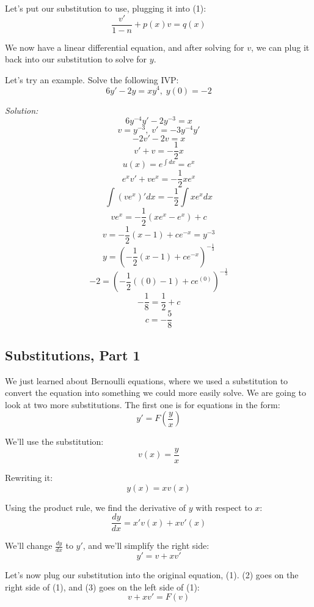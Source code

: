 Let's put our substitution to use, plugging it into (1):
$$\frac{v'}{1 - n} + p(x)v = q(x)$$

We now have a linear differential equation, and after solving for $v$, we can plug it back into our substitution to solve for $y$.

Let's try an example. Solve the following IVP:
$$6y' - 2y = xy^{4},\; y(0) = -2$$

\textit{Solution:}
$$6y^{-4}y' - 2y^{-3} = x$$
$$v = y^{-3},\; v' = -3y^{-4}y'$$
$$-2v' - 2v = x$$
$$v' + v = -\frac{1}{2}x$$
$$u(x) = e^{\int dx} = e^{x}$$
$$e^{x}v' + ve^{x} = -\frac{1}{2}xe^{x}$$
$$\int (ve^{x})'dx = -\frac{1}{2}\int xe^{x}dx$$
$$ve^{x} = -\frac{1}{2}(xe^{x} - e^{x}) + c$$
$$v = -\frac{1}{2}(x - 1) + ce^{-x} = y^{-3}$$
$$y = \left(-\frac{1}{2}(x - 1) + ce^{-x}\right)^{-\frac{1}{3}}$$
$$-2 = \left(-\frac{1}{2}((0) - 1) + ce^{(0)}\right)^{-\frac{1}{3}}$$
$$-\frac{1}{8} = \frac{1}{2} + c$$
$$c = -\frac{5}{8}$$
\begin{center}
\end{center}

\subsection{Substitutions, Part 1}
We just learned about Bernoulli equations, where we used a substitution to convert the equation into something we could more easily solve. We are going to look at two more substitutions. The first one is for equations in the form:
\begin{equation}
	y' = F\left(\frac{y}{x}\right)
\end{equation}

We'll use the substitution:
\begin{equation}
	v(x) = \frac{y}{x}
\end{equation}

Rewriting it:
$$y(x) = xv(x)$$

Using the product rule, we find the derivative of $y$ with respect to $x$:
$$\frac{dy}{dx} = x'v(x) + xv'(x)$$

We'll change $\frac{dy}{dx}$ to $y'$, and we'll simplify the right side:
\begin{equation}
	y' = v + xv'
\end{equation}

Let's now plug our substitution into the original equation, (1). (2) goes on the right side of (1), and (3) goes on the left side of (1):
$$v + xv' = F(v)$$

